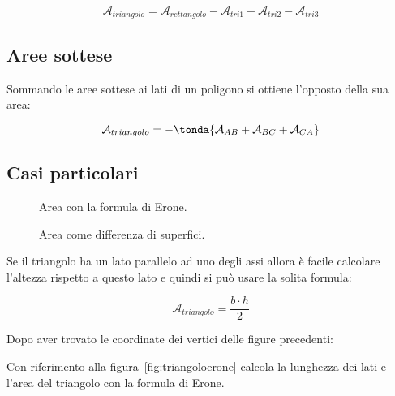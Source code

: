 \[\mathcal{A}_{triangolo} = \mathcal{A}_{rettangolo}-\mathcal{A}_{tri1}
                                                    -\mathcal{A}_{tri2}
                                                    -\mathcal{A}_{tri3}\]

\subsection*{Aree sottese}
Sommando le aree sottese ai lati di un poligono si ottiene l'opposto della 
sua area:

\[\mathcal{A}_{triangolo} = -\tonda{\mathcal{A}_{AB} + 
                            \mathcal{A}_{BC} +
                            \mathcal{A}_{CA}}\]

\subsection*{Casi particolari}

\begin{inaccessibleblock}
 \begin{figure}[h]
 \centering
 \begin{minipage}[t]{.45\textwidth}
  \centering \triangoloparallelox
  \caption{Area con la formula di Erone.}\label{fig:triangoloparallelox}
 \end{minipage}\hfil
 \begin{minipage}[t]{.45\textwidth}
    \centering \triangoloparalleloy
  \caption{Area come differenza di superfici.}\label{fig:triangoloparalleloy}
 \end{minipage}\hfil
\end{figure}
\end{inaccessibleblock}

Se il triangolo ha un lato parallelo ad uno degli assi allora è facile 
calcolare l'altezza rispetto a questo lato e quindi si può usare la 
solita formula:

\[\mathcal{A}_{triangolo} = \frac{b \cdot h}{2}\]

 Dopo aver trovato le coordinate dei vertici delle figure precedenti:

 \begin{esempio}
 \label{ex:D.18}
  Con riferimento alla figura~\ref{fig:triangoloerone} calcola 
  la lunghezza dei lati e l'area del triangolo con la formula di Erone.
 \end{esempio}

